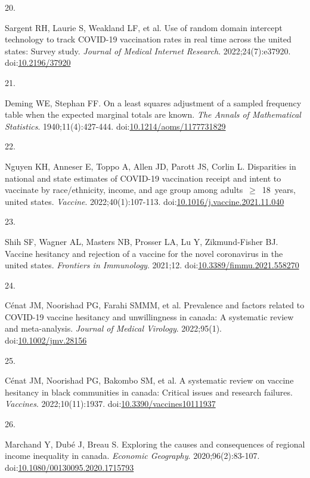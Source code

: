 \documentclass[
  letterpaper,
  DIV=11,
  numbers=noendperiod]{scrartcl}
\newlength{\cslhangindent}
\newlength{\csllabelwidth}
\newlength{\cslentryspacingunit} %
\newenvironment{CSLReferences}[2] %
 {%
  \setlength{\parindent}{0pt}
  \ifodd #1
  \let\oldpar\par
  \def\par{\hangindent=\cslhangindent\oldpar}
  \fi
  \setlength{\parskip}{#2\cslentryspacingunit}
 }%
 {}
\newcommand{\CSLLeftMargin}[1]{\parbox[t]{\csllabelwidth}{#1}}
\newcommand{\CSLRightInline}[1]{\parbox[t]{\linewidth - \csllabelwidth}{#1}\break}
\begin{document}
\begin{CSLReferences}{0}{0}
\leavevmode{}%
\CSLLeftMargin{20. }%
\CSLRightInline{Sargent RH, Laurie S, Weakland LF, et al. Use of random
domain intercept technology to track {COVID}-19 vaccination rates in
real time across the united states: Survey study. \emph{Journal of
Medical Internet Research}. 2022;24(7):e37920.
doi:\href{https://doi.org/10.2196/37920}{10.2196/37920}}

\leavevmode{}%
\CSLLeftMargin{21. }%
\CSLRightInline{Deming WE, Stephan FF. On a least squares adjustment of
a sampled frequency table when the expected marginal totals are known.
\emph{The Annals of Mathematical Statistics}. 1940;11(4):427-444.
doi:\href{https://doi.org/10.1214/aoms/1177731829}{10.1214/aoms/1177731829}}

\leavevmode{}%
\CSLLeftMargin{22. }%
\CSLRightInline{Nguyen KH, Anneser E, Toppo A, Allen JD, Parott JS,
Corlin L. Disparities in national and state estimates of {COVID}-19
vaccination receipt and intent to vaccinate by race/ethnicity, income,
and age group among adults~\(\geq\)~18~years, united states.
\emph{Vaccine}. 2022;40(1):107-113.
doi:\href{https://doi.org/10.1016/j.vaccine.2021.11.040}{10.1016/j.vaccine.2021.11.040}}

\leavevmode{}%
\CSLLeftMargin{23. }%
\CSLRightInline{Shih SF, Wagner AL, Masters NB, Prosser LA, Lu Y,
Zikmund-Fisher BJ. Vaccine hesitancy and rejection of a vaccine for the
novel coronavirus in the united states. \emph{Frontiers in Immunology}.
2021;12.
doi:\href{https://doi.org/10.3389/fimmu.2021.558270}{10.3389/fimmu.2021.558270}}

\leavevmode{}%
\CSLLeftMargin{24. }%
\CSLRightInline{Cénat JM, Noorishad PG, Farahi SMMM, et al. Prevalence
and factors related to {COVID}-19 vaccine hesitancy and unwillingness in
canada: A systematic review and meta-analysis. \emph{Journal of Medical
Virology}. 2022;95(1).
doi:\href{https://doi.org/10.1002/jmv.28156}{10.1002/jmv.28156}}

\leavevmode{}%
\CSLLeftMargin{25. }%
\CSLRightInline{Cénat JM, Noorishad PG, Bakombo SM, et al. A systematic
review on vaccine hesitancy in black communities in canada: Critical
issues and research failures. \emph{Vaccines}. 2022;10(11):1937.
doi:\href{https://doi.org/10.3390/vaccines10111937}{10.3390/vaccines10111937}}

\leavevmode{}%
\CSLLeftMargin{26. }%
\CSLRightInline{Marchand Y, Dubé J, Breau S. Exploring the causes and
consequences of regional income inequality in canada. \emph{Economic
Geography}. 2020;96(2):83-107.
doi:\href{https://doi.org/10.1080/00130095.2020.1715793}{10.1080/00130095.2020.1715793}}

\end{CSLReferences}
\end{document}
